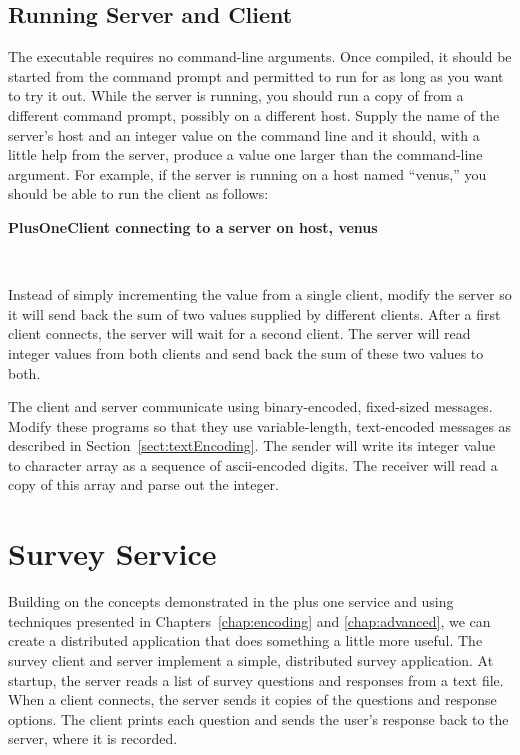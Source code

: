 \subsection{Running Server and Client}

The executable  requires no command-line
arguments.  Once compiled, it should be started from the command
prompt and permitted to run for as long as you want to try it out.
While the server is running, you should run a copy of
 from a different command prompt, possibly on a
different host.  Supply the name of the server's host and an integer
value on the command line and it should, with a little help from the
server, produce a value one larger than the command-line argument.
For example, if the server is running on a host named ``venus,'' you
should be able to run the client as follows:

\noindent \textbf{PlusOneClient connecting to a server on host, venus}
\begin{shell}
\prompt {} \\
\end{shell}

\begin{exercises}

\item Instead of simply incrementing the value from a single client,
  modify the server so it will send back the sum of two values
  supplied by different clients.  After a first client connects, the
  server will wait for a second client.  The server will read integer
  values from both clients and send back the sum of these two values
  to both.

\item The client and server communicate using binary-encoded,
  fixed-sized messages.  Modify these programs so that they use
  variable-length, text-encoded messages as described in
  Section~\ref{sect:textEncoding}.  The sender will write its integer
  value to character array as a sequence of ascii-encoded digits.  The
  receiver will read a copy of this array and parse out the integer.

\end{exercises}

\section{Survey Service}

Building on the concepts demonstrated in the plus one service and
using techniques presented in Chapters~\ref{chap:encoding} and
\ref{chap:advanced}, we can create a distributed application that does
something a little more useful.  The survey client and server
implement a simple, distributed survey application.  At startup, the
server reads a list of survey questions and responses from a text
file.  When a client connects, the server sends it copies of the
questions and response options.  The client prints each question and
sends the user's response back to the server, where it is recorded.

